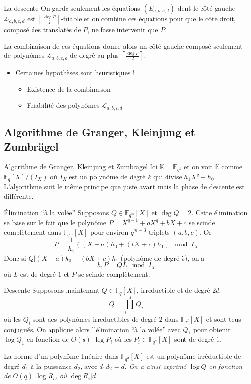 \documentclass[xcolor=x11names,compress]{beamer}
\theoremstyle{break}
\theoremstyle{sc}
\theoremstyle{definition}
\theoremstyle{remark}
\begin{document}
\begin{frame}{La descente}
  On garde seulement les équations $(E_{a, b, c, d})$ dont le côté gauche
  $\mathcal L_{a, b, c, d}$ est
  $\left\lceil \frac{\deg P}{2}\right\rceil$-friable et on combine ces équations
  pour que le côté droit, composé des translatés de $P$, ne fasse intervenir que
  $P$.

  La combinaison de ces équations donne alors un côté gauche composé seulement
  de polynômes $\mathcal L_{a, b, c, d}$ de degré au plus $\left\lceil \frac{\deg P}{2}\right\rceil$.
  \begin{itemize}
    \item Certaines hypothèses sont heuristiques !
      \begin{itemize}
        \item Existence de la combinaison
        \item Friabilité des polynômes $\mathcal L_{a, b, c, d}$
      \end{itemize}
  \end{itemize}
\end{frame}


\subsection{Algorithme de Granger, Kleinjung et Zumbrägel}

\begin{frame}{Algorithme de Granger, Kleinjung et Zumbrägel}
  Ici $\mathbb{K}=\mathbb{F}_{q^k}$ et on voit $\mathbb{K}$ comme
  $\mathbb{F}_q[X]/(I_X)$ où $I_X$ est un polynôme de degré $k$ qui divise
  $h_1X^q-h_0$. L'algorithme suit le même principe que juste avant mais la phase
  de descente est différente. 
\end{frame}

\begin{frame}{Élimination ``à la volée''}
  Supposons $Q\in \mathbb{F}_{q^m}[X]$ et $\deg Q = 2$. Cette élimination se base
  sur le fait que le polynôme $P = X^{q+1}+aX^q+bX+c$ se scinde complètement
  dans $\mathbb{F}_{q^m}[X]$ pour
  environ $q^{m-3}$ triplets $(a, b, c)$. Or 
  \[
    P = \frac{1}{h_1}((X+a)h_0 + (bX+c)h_1)\mod I_X
  \]
  Donc si $Q| (X+a)h_0 + (bX+c)h_1$ (polynôme de degré $3$), on a 
  \[
    h_1P=QL \mod I_X
  \]
  où $L$ est de degré $1$ et $P$ se scinde complètement.

\end{frame}

\begin{frame}{Descente}
  Supposons maintenant $Q\in\mathbb{F}_{q}[X]$, irreductible et de degré $2d$.
  \[
    Q=\prod_{i=1}^d Q_i
  \]
  où les $Q_i$ sont des polynômes irreductibles de degré $2$ dans
  $\mathbb{F}_{q^d}[X]$ et sont tous conjugués. On applique alors
  l'élimination ``à la volée'' avec $Q_1$ pour obtenir $\log Q_1$ en fonction
  de $O(q)$ $\log P_i$ où les $P_i\in \mathbb{F}_{q^d}[X]$ sont de degré $1$.
  
  La norme d'un polynôme linéaire dans $\mathbb{F}_{q^d}[X]$ est un polynôme
  irréductible de degré $d_1$ à la puissance $d_2$, avec $d_1d_2 = d$.
  \emph{On a ainsi exprimé $\log Q$ en fonction de $O(q)$ $\log R_i$, où $\deg
  R_i | d$}
\end{frame}

\end{document}
